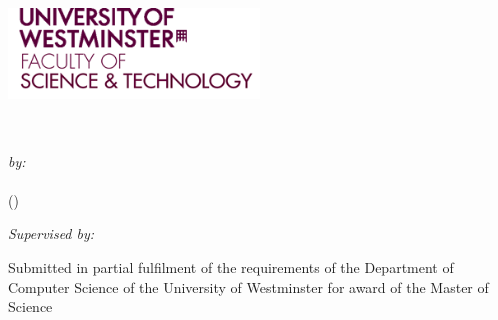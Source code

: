 \begin{titlepage}
\includegraphics[width=0.5\textwidth]{./images/WestminsterLogo}~\\[1cm]

\begin{center}
{ \huge \bfseries \projecttitle \\[0.4cm] }
\noindent
\begin{minipage}{0.4\textwidth}
	 \begin{center}
	 \large
		\emph{by:}\\
		\studentfname{} \textsc{\studentlname{}}\\
		(\studentnumber)
	\end{center}
	\end{minipage}
\vfill
	 \begin{minipage}{0.4\textwidth}
	 \begin{center}
		 \large
			\emph{Supervised by:} \\
			\tutortitle{} \tutorfname{} \textsc{\tutorlname{}}
	\end{center}	
	\end{minipage}
\vfill

	\begin{minipage}{0.6\textwidth}
Submitted in partial fulfilment of the requirements of
the Department of Computer Science
of the University of Westminster
for award of the Master of Science\\
	\end{minipage}
\vfill
{\large \submitdate}\\
\end{center}
\end{titlepage}